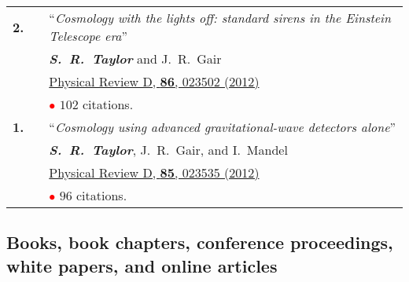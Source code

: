 \documentclass[11pt,letterpaper,sans]{moderncv}
\begin{document}
{\begin{longtable}{rp{0.3cm}p{15.8cm}}
\textbf{2.} & & ``\textit{Cosmology with the lights off: standard sirens in the Einstein Telescope era}'' \\ 
&& \textit{\textbf{S.~R.~Taylor}} and J.~R.~Gair \\ 
&& \href{http://journals.aps.org/prd/abstract/10.1103/PhysRevD.86.023502}{{\color{color1} Physical Review D, \textbf{86}, 023502 (2012)}} \\
&& \textcolor{red}{$\bullet$} $102$ citations. \vspace{0.09cm}\\
\textbf{1.} & & ``\textit{Cosmology using advanced gravitational-wave detectors alone}'' \\ 
&& \textit{\textbf{S.~R.~Taylor}}, J.~R.~Gair, and I.~Mandel \\ 
&& \href{http://journals.aps.org/prd/abstract/10.1103/PhysRevD.85.023535}{{\color{color1} Physical Review D, \textbf{85}, 023535 (2012)}} \\
&& \textcolor{red}{$\bullet$} $96$ citations. \vspace{0.09cm}\\
\end{longtable}
}

\subsection{Books, book chapters, conference proceedings, white papers, and online articles} \vspace{-0.4cm}
\end{document}
